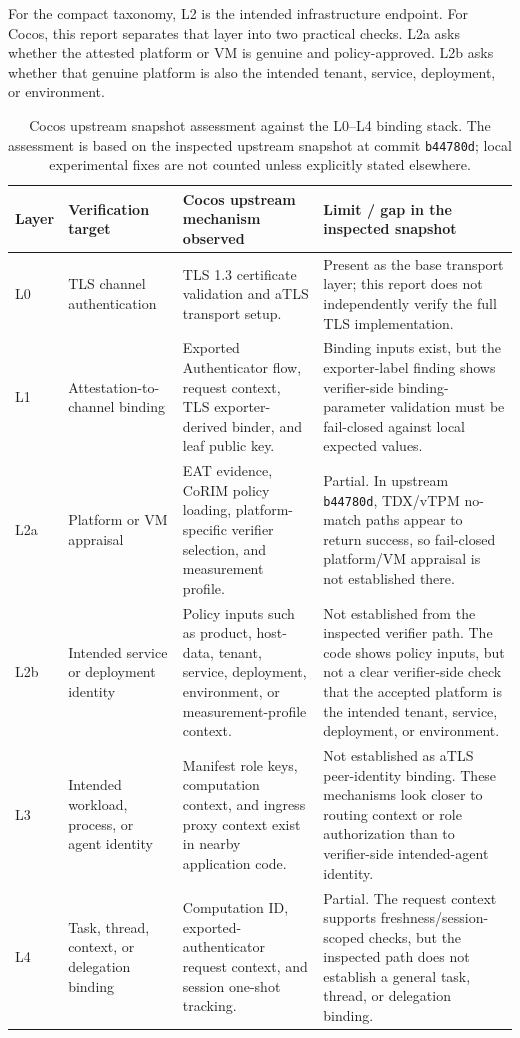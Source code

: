 \documentclass[11pt,a4paper]{article}
\begin{document}
For the compact taxonomy, L2 is the intended infrastructure endpoint. For
Cocos, this report separates that layer into two practical checks. L2a asks
whether the attested platform or VM is genuine and policy-approved. L2b asks
whether that genuine platform is also the intended tenant, service, deployment,
or environment.

\begin{table}[H]
\centering
\footnotesize
\begin{tabularx}{\textwidth}{@{}>{\raggedright\arraybackslash}p{}>{\raggedright\arraybackslash}p{}>{\raggedright\arraybackslash}p{}>{\raggedright\arraybackslash}X@{}}
\toprule
\textbf{Layer} & \textbf{Verification target} & \textbf{Cocos upstream mechanism observed} & \textbf{Limit / gap in the inspected snapshot} \\
\midrule
L0 & TLS channel authentication & TLS 1.3 certificate validation and aTLS transport setup. & Present as the base transport layer; this report does not independently verify the full TLS implementation. \\
L1 & Attestation-to-channel binding & Exported Authenticator flow, request context, TLS exporter-derived binder, and leaf public key. & Binding inputs exist, but the exporter-label finding shows verifier-side binding-parameter validation must be fail-closed against local expected values. \\
L2a & Platform or VM appraisal & EAT evidence, CoRIM policy loading, platform-specific verifier selection, and measurement profile. & Partial. In upstream \texttt{b44780d}, TDX/vTPM no-match paths appear to return success, so fail-closed platform/VM appraisal is not established there. \\
L2b & Intended service or deployment identity & Policy inputs such as product, host-data, tenant, service, deployment, environment, or measurement-profile context. & Not established from the inspected verifier path. The code shows policy inputs, but not a clear verifier-side check that the accepted platform is the intended tenant, service, deployment, or environment. \\
L3 & Intended workload, process, or agent identity & Manifest role keys, computation context, and ingress proxy context exist in nearby application code. & Not established as aTLS peer-identity binding. These mechanisms look closer to routing context or role authorization than to verifier-side intended-agent identity. \\
L4 & Task, thread, context, or delegation binding & Computation ID, exported-authenticator request context, and session one-shot tracking. & Partial. The request context supports freshness/session-scoped checks, but the inspected path does not establish a general task, thread, or delegation binding. \\
\bottomrule
\end{tabularx}
\caption{Cocos upstream snapshot assessment against the L0--L4 binding stack. The assessment is based on the inspected upstream snapshot at commit \texttt{b44780d}; local experimental fixes are not counted unless explicitly stated elsewhere.}
\label{tab:cocos-upstream-binding-assessment}
\end{table}
\end{document}
